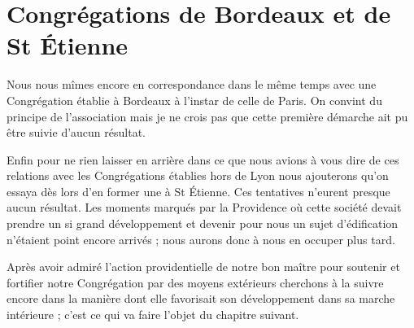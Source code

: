 \section*{Congrégations de Bordeaux et de St Étienne}
Nous nous mîmes encore en correspondance dans le même temps avec une Congrégation établie à Bordeaux à l'instar de celle de Paris. On convint du principe de l'association mais je ne crois pas que cette première démarche ait pu être suivie d'aucun résultat.

Enfin pour ne rien laisser en arrière dans ce que nous avions à vous dire de ces relations avec les Congrégations établies hors de Lyon nous ajouterons qu'on essaya dès lors d'en former une à St Étienne. Ces tentatives n'eurent presque aucun résultat. Les moments marqués par la Providence où cette société devait prendre un si grand développement et devenir pour nous un sujet d'édification n'étaient point encore arrivés ; nous aurons donc à nous en occuper plus tard.

Après avoir admiré l'action providentielle de notre bon maître pour soutenir et fortifier notre Congrégation par des moyens extérieurs cherchons à la suivre encore dans la manière dont elle favorisait son développement dans sa marche intérieure ; c'est ce qui va faire l'objet du chapitre suivant.
